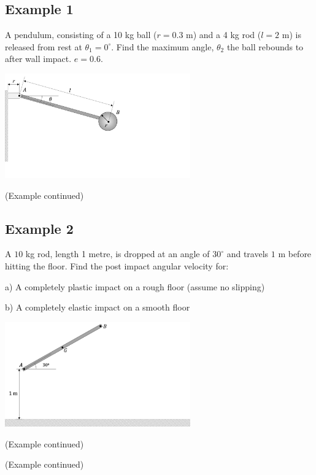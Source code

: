 \documentclass[12pt,letterpaper,twoside]{report}
\begin{document}
\subsection{Example 1}
A pendulum, consisting of a 10 kg ball ($r = 0.3$ m) and a 4 kg rod ($l = 2$ m) is released from rest at $\theta_1 = 0^{\circ}$.  Find the maximum angle, $\theta_2$ the ball rebounds to after wall impact.  $e = 0.6$.

\includegraphics[trim={0cm 8cm 12cm 0cm},clip,width=0.6\textwidth, left]{Slide114}

\newpage
 
(Example continued)

\newpage


\subsection{Example 2}
A $10$ kg rod, length 1 metre, is dropped at an angle of $30^{\circ}$ and travels $1$ m before hitting the floor.  Find the post impact angular velocity for:

a)	A completely plastic impact on a rough floor (assume no slipping)

b)	A completely elastic impact on a smooth floor

\includegraphics[trim={0cm 0cm 12cm 0cm},clip,width=0.6\textwidth, left]{Slide115}

\newpage

(Example continued)

\newpage

(Example continued)
\end{document}
